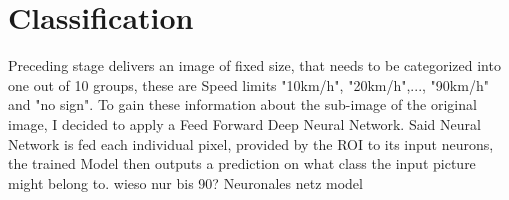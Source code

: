 \section{Classification}
Preceding stage delivers an image of fixed size, that needs to be categorized into one out of 10 groups, these are Speed limits "10km/h", "20km/h",..., "90km/h" and "no sign". To gain these information about the sub-image of the original image, I decided to apply a Feed Forward Deep Neural Network. Said Neural Network is fed each individual pixel, provided by the ROI to its input neurons, the trained Model then outputs a prediction on what class the input picture might belong to. 
\newline
wieso nur bis 90? 
\newline
Neuronales netz model